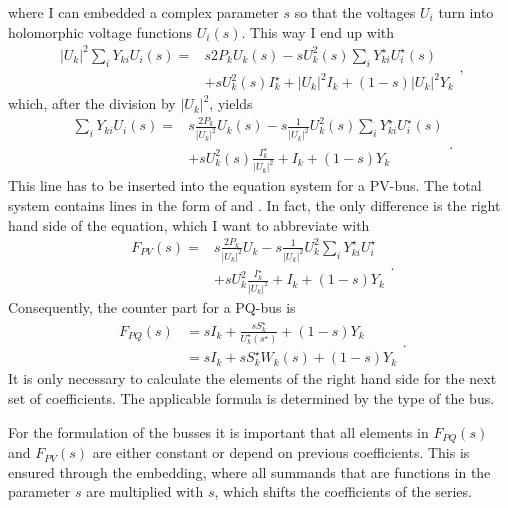 where I can embedded a complex parameter $s$ so that the voltages $U_i$ turn into holomorphic voltage functions $U_i(s)$. This way I end up with
\begin{equation}
	\begin{split}
		|U_k|^2 \sum_i Y_{ki} U_i(s) = 
			& s 2 P_k U_k(s) - s U_k^2(s) \sum_i Y_{ki}^\star U_i^\star(s) \\
			& + s U_k^2(s) I_k^\star + |U_k|^2 I_k + (1 - s) |U_k|^2 Y_k
	\end{split},
\end{equation}
which, after the division by $|U_k|^2$, yields
\begin{equation}
	\begin{split}
		\sum_i Y_{ki} U_i(s) = 
			& s \frac{2 P_k}{|U_k|^2} U_k(s) - s \frac{1}{|U_k|^2} U_k^2(s) \sum_i Y_{ki}^\star U_i^\star(s) \\
			& + s U_k^2(s) \frac{I_k^\star}{|U_k|^2} + I_k + (1 - s) Y_k
	\end{split}.
	\label{eq:pv_bus_helm}
\end{equation}
This line has to be inserted into the equation system for a PV-bus. The total system contains lines in the form of  and . In fact, the only difference is the right hand side of the equation, which I want to abbreviate with
\begin{equation}
	\begin{split}
		F_{PV}(s) = 
			& s \frac{2 P_k}{|U_k|^2} U_k - s \frac{1}{|U_k|^2} U_k^2 \sum_i Y_{ki}^\star U_i^\star \\
			& + s U_k^2 \frac{I_k^\star}{|U_k|^2} + I_k + (1 - s) Y_k
	\end{split}.
	\label{eq:rhs_pv}
\end{equation}
Consequently, the counter part for a PQ-bus is
\begin{equation}
	\begin{split}
		F_{PQ}(s) 	& = s I_k + \frac{s S_k^\star}{U_k^\star(s^\star)} + (1 - s) Y_k \\
				& = s I_k + s S_k^\star W_k(s) + (1 - s) Y_k
	\end{split}.
	\label{eq:rhs_pq}
\end{equation}
It is only necessary to calculate the elements of the right hand side for the next set of coefficients. The applicable formula is determined by the type of the bus.

For the formulation of the busses it is important that all elements in $F_{PQ}(s)$ and $F_{PV}(s)$ are either constant or depend on previous coefficients. This is ensured through the embedding, where all summands that are functions in the parameter $s$ are multiplied with $s$, which shifts the coefficients of the series.


